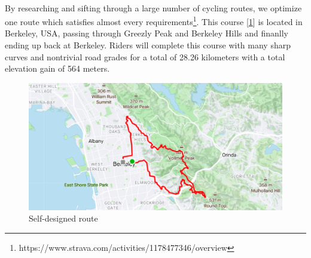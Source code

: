 
\paragraph{} By researching and sifting through a large number of cycling routes, we optimize one route which satisfies almost every requirements\footnote{https://www.strava.com/activities/1178477346/overview}. This course [\ref{route}] is located in Berkeley, USA, passing through Greezly Peak and Berkeley Hills and finanlly ending up back at Berkeley. Riders will complete this course with many sharp curves and nontrivial road grades for a total of 28.26 kilometers with a total elevation gain of 564 meters.
\begin{figure}[h]
	\centering
	\includegraphics[width=1\linewidth]{image/route}
	\caption{Self-designed route}
	\label{route}
\end{figure}

